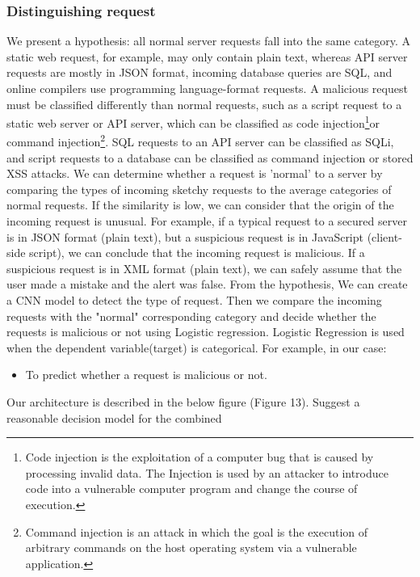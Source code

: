 \subsubsection{Distinguishing request}
\label{distinguishing request}
We present a hypothesis: all normal server requests fall into the same category. A static web request, for example, may only contain plain text, whereas API server requests are mostly in JSON format, incoming database queries are SQL, and online compilers use programming language-format requests. A malicious request must be classified differently than normal requests, such as a script request to a static web server or API server, which can be classified as code injection\footnote{Code injection is the exploitation of a computer bug that is caused by processing invalid data. The Injection is used by an attacker to introduce code into a vulnerable computer program and change the course of execution.}or command injection\footnote{Command injection is an attack in which the goal is the execution of arbitrary commands on the host operating system via a vulnerable application.}. SQL requests to an API server can be classified as SQLi, and script requests to a database can be classified as command injection or stored XSS attacks. We can determine whether a request is 'normal' to a server by comparing the types of incoming sketchy requests to the average categories of normal requests. If the similarity is low, we can consider that the origin of the incoming request is unusual. For example, if a typical request to a secured server is in JSON format (plain text), but a suspicious request is in JavaScript (client-side script), we can conclude that the incoming request is malicious. If a suspicious request is in XML format (plain text), we can safely assume that the user made a mistake and the alert was false.\newline
From the hypothesis, We can create a CNN model to detect the type of request. Then we compare the incoming requests with the "normal" corresponding category and decide whether the requests is malicious or not using Logistic regression.\newline
Logistic Regression is used when the dependent variable(target) is categorical.\newline
For example, in our case: 
\begin{itemize}
    \item  To predict whether a request is malicious or not.
\end{itemize}
Our architecture is described in the below figure (Figure 13). Suggest a reasonable decision model for the combined 

